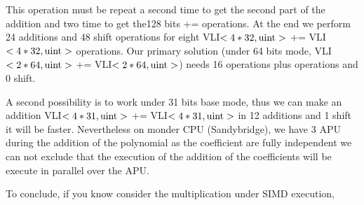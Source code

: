 \documentclass[11pt]{amsart}
\begin{document}
This operation must be repeat a second time to get the second part of the addition and two time to get the128 bits += operations. At the end we perform 24 additions and 48  shift operations for eight VLI$<4*32, \texttt{\textrm{uint}}>$ += VLI$<4*32, \texttt{\textrm{uint}}>$ operations. Our primary solution (under 64 bits mode,  VLI$<2*64, \texttt{\textrm{uint}}>$ += VLI$<2*64, \texttt{\textrm{uint}}>$) needs 16 operations plus operations and 0 shift. 

A second possibility is to work under 31 bits base mode, thus we can make an addition
 VLI$<4*31, \texttt{\textrm{uint}}>$ += VLI$<4*31, \texttt{\textrm{uint}}>$  in  12 additions and 1 shift it will be faster. Nevertheless on monder CPU (Sandybridge), we have 3 APU during the addition of the polynomial as the coefficient are fully independent 
 we can not exclude that the execution of  the addition of the coefficients will be execute in parallel over the APU. 

To conclude, if you know consider the multiplication under SIMD execution, 
\end{document}
